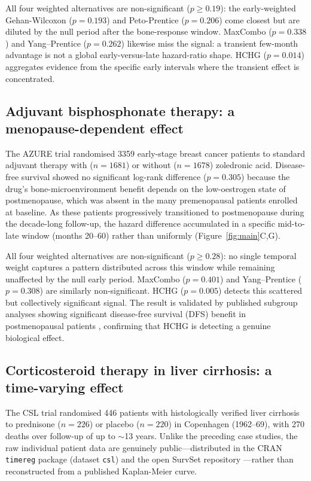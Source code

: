 \documentclass[11pt]{article}
\begin{document}
All four weighted alternatives are non-significant ($p \geq 0.19$):
the early-weighted Gehan-Wilcoxon ($p = 0.193$) and Peto-Prentice
($p = 0.206$) come closest but are diluted by the null period after
the bone-response window. MaxCombo ($p = 0.338$) and Yang--Prentice
($p = 0.262$) likewise miss the signal: a transient few-month advantage
is not a global early-versus-late hazard-ratio shape. HCHG ($p = 0.014$) aggregates evidence from the specific early intervals
where the transient effect is concentrated.

\subsection*{Adjuvant bisphosphonate therapy: a menopause-dependent effect}

The AZURE trial \citep{coleman2011,coleman2014} randomised 3359 early-stage
breast cancer patients to standard adjuvant therapy with ($n=1681$) or
without ($n=1678$) zoledronic acid. Disease-free survival showed no
significant log-rank difference ($p = 0.305$) because the drug's
bone-microenvironment benefit depends on the low-oestrogen state of
postmenopause, which was absent in the many premenopausal patients
enrolled at baseline. As these patients progressively transitioned to
postmenopause during the decade-long follow-up, the hazard difference
accumulated in a specific mid-to-late window (months 20--60) rather than
uniformly (Figure~\ref{fig:main}C,G).

All four weighted alternatives are non-significant ($p \geq 0.28$):
no single temporal weight captures a pattern distributed across this
window while remaining unaffected by the null early period. MaxCombo
($p = 0.401$) and Yang--Prentice ($p = 0.308$) are similarly
non-significant. HCHG
($p = 0.005$) detects this scattered but collectively significant signal.
The result is validated by published subgroup analyses showing significant disease-free survival (DFS) benefit in postmenopausal patients \citep{coleman2011,coleman2014},
confirming that HCHG is detecting a genuine biological effect.

\subsection*{Corticosteroid therapy in liver cirrhosis: a time-varying effect}

The CSL trial \citep{csl_data} randomised 446 patients with histologically
verified liver cirrhosis to prednisone ($n=226$) or placebo ($n=220$) in
Copenhagen (1962--69), with 270 deaths over follow-up of up to
$\sim$13 years. Unlike the preceding case studies, the raw individual
patient data are genuinely public---distributed in the CRAN \texttt{timereg}
package (dataset \texttt{csl}) and the open SurvSet repository
\citep{survset2022}---rather than reconstructed from a published
Kaplan-Meier curve.
\end{document}
